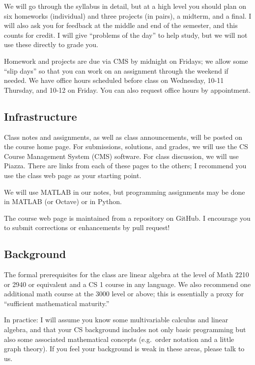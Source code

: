 \documentclass[12pt, leqno]{article}
\begin{document}
We will go through the syllabus in detail, but at a high level you
should plan on six homeworks (individual) and three projects (in
pairs), a midterm, and a final.  I will also ask you for feedback at
the middle and end of the semester, and this counts for credit.  I
will give ``problems of the day'' to help study, but we will not use
these directly to grade you.

Homework and projects are due via CMS by midnight on Fridays; we allow
some ``slip days'' so that you can work on an assignment through the
weekend if needed.  We have office hours scheduled before class on
Wednesday, 10-11 Thursday, and 10-12 on Friday.  You can also request
office hours by appointment.

\subsection*{Infrastructure}

Class notes and assignments, as well as class announcements, will be
posted on the course home page.  For submissions, solutions, and
grades, we will use the CS Course Management System (CMS) software.
For class discussion, we will use Piazza.  There are links from each
of these pages to the others; I recommend you use the class web page
as your starting point.

We will use MATLAB in our notes, but programming assignments may be
done in MATLAB (or Octave) or in Python.

The course web page is maintained from a repository on GitHub.
I encourage you to submit corrections or enhancements by pull
request!

\subsection*{Background}

The formal prerequisites for the class are linear algebra at the level
of Math 2210 or 2940 or equivalent and a CS 1 course in any language.
We also recommend one additional math course at the 3000 level or
above; this is essentially a proxy for ``sufficient mathematical
maturity.''

In practice: I will assume you know some multivariable calculus
and linear algebra, and that your CS background includes not only
basic programming but also some associated mathematical concepts
(e.g.~order notation and a little graph theory).  If you feel your
background is weak in these areas, please talk to us.
\end{document}
